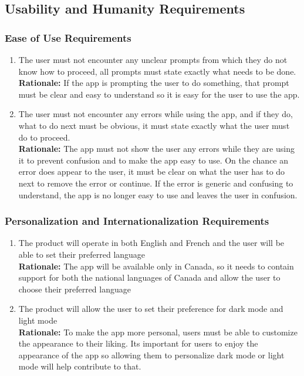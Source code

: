 \documentclass[]{article}
\begin{document}

\subsection{Usability and Humanity Requirements}
\label{sub:usability_and_humanity_requirements}

\subsubsection{Ease of Use Requirements}
\label{ssub:ease_of_use_requirements}
\begin{enumerate}[{UH-EOU}1. ]
	\item The user must not encounter any unclear prompts from which they do not know how to proceed, \color{red} all prompts must state exactly what needs to be done. \color{black} \\
	{\bf Rationale:} If the app is prompting the user to do something, that prompt must be clear and easy to understand so it is easy for the user to use the app.
	\item The user must not encounter any errors while using the app, and if they do, what to do next must be \color{red} obvious, it must state exactly what the user must do to proceed. \color{black} \\
	{\bf Rationale:} The app must not show the user any errors while they are using it to prevent confusion and to make the app easy to use. On the chance an error does appear to the user, it must be clear on what the user has to do next to remove the error or continue. If the error is generic and confusing to understand, the app is no longer easy to use and leaves the user in confusion.
\end{enumerate}

\subsubsection{Personalization and Internationalization Requirements}
\label{ssub:personalization_and_internationalization_requirements}
\begin{enumerate}[{UH-PI}1. ]
	\item The product will operate in both English and French and the user will be able to set their preferred language \\
	{\bf Rationale:} The app will be available only in Canada, so it needs to contain support for both the national languages of Canada and allow the user to choose their preferred language
	\item The product will allow the user to set their preference for dark mode and light mode \\
	{\bf Rationale:} To make the app more personal, users must be able to customize the appearance to their liking. Its important for users to enjoy the appearance of the app so allowing them to personalize dark mode or light mode will help contribute to that.
\end{enumerate}
\end{document}
